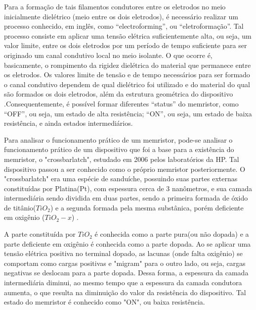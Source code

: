 \documentclass{ceel}
\begin{document}
\begin{multicols}{2}
Para a formação de tais filamentos condutores entre os eletrodos no meio inicialmente dielétrico (meio entre os dois eletrodos), é necessário realizar um processo conhecido, em inglês, como “electroforming”, ou “eletroformação”. Tal %
processo consiste em aplicar uma tensão elétrica suficientemente alta, ou seja, um valor limite, entre os dois eletrodos por um período de tempo suficiente para ser originado um canal condutivo local no meio isolante. O que ocorre é, basicamente, o rompimento da rigidez dielétrica do material que permanece entre os eletrodos. %
Os valores limite de tensão e de tempo necessários para ser formado o canal condutivo dependem de qual dielétrico foi utilizado e do material do qual são formados os dois eletrodos, além da estrutura geométrica do dispositivo \cite{us}.Consequentemente, é possível formar diferentes “status” do memristor, como “OFF”, ou seja, um estado de alta resistência; “ON”, ou seja, um estado de baixa resistência, e ainda estados intermediários. %

Para analisar o funcionamento prático de um memristor, pode-se analisar o funcionamento prático de um dispositivo que foi a base para a existência do memristor, o "crossbarlatch", estudado em 2006 pelos %
laboratórios da HP. Tal dispositivo passou a ser conhecido como o próprio memristor posteriormente. O "crossbarlatch" era uma espécie de sanduíche, possuindo suas partes externas constituídas por Platina(Pt), com espessura cerca de 3 nanômetros, e sua camada intermediária sendo dividida em duas partes, sendo a primeira formada de óxido de titânio($TiO_2$) e a segunda formada pela mesma substânica, porém deficiente em oxigênio ($TiO_2-x$) \cite{construcao}.  

A parte constituída por $TiO_2$ é conhecida como a parte pura(ou não dopada) e a parte deficiente em oxigênio é conhecida como a parte dopada. Ao se aplicar uma tensão elétrica positiva 
no terminal dopado, as lacunas (onde falta oxigênio) se comportam como cargas positivas e "migram" para o outro lado, ou seja, cargas negativas se deslocam para a parte dopada. Dessa 
forma, a espessura da camada intermediária diminui, ao mesmo tempo que a espessura da camada condutora aumenta, o que resulta na diminuição do valor da resistência do dispositivo. Tal 
estado do memristor é conhecido como "ON", ou baixa resistência. %


\end{multicols}
\end{document}
